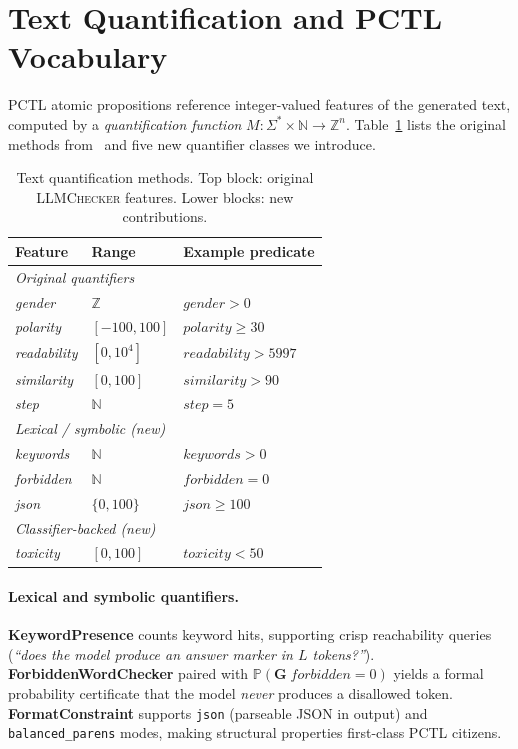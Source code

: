 \documentclass{article}
\newcommand{\Prob}{\mathbb{P}}
\newcommand{\Nat}{\mathbb{N}}
\begin{document}
\section{Text Quantification and PCTL Vocabulary}
\label{sec:quant}

PCTL atomic propositions reference integer-valued features of the generated
text, computed by a \emph{quantification function} $M: \Sigma^* \times \Nat \to
\mathbb{Z}^n$.
Table~\ref{tab:quant} lists the original methods from~\citet{gross2025llmchecker}
and five new quantifier classes we introduce.

\begin{table}[tb]
\centering
\small
\caption{Text quantification methods. Top block: original \textsc{LLMChecker}
features. Lower blocks: new contributions.}
\label{tab:quant}
\begin{tabular}{llp{2.5cm}}
\toprule
Feature & Range & Example predicate \\
\midrule
\multicolumn{3}{l}{\textit{Original quantifiers}} \\
\textit{gender} & $\mathbb{Z}$ & $\textit{gender} > 0$ \\
\textit{polarity} & $[-100, 100]$ & $\textit{polarity} \ge 30$ \\
\textit{readability} & $[0, 10^4]$ & $\textit{readability} > 5997$ \\
\textit{similarity} & $[0, 100]$ & $\textit{similarity} > 90$ \\
\textit{step} & $\Nat$ & $\textit{step} = 5$ \\
\midrule
\multicolumn{3}{l}{\textit{Lexical / symbolic (new)}} \\
\textit{keywords} & $\Nat$ & $\textit{keywords} > 0$ \\
\textit{forbidden} & $\Nat$ & $\textit{forbidden} = 0$ \\
\textit{json} & $\{0, 100\}$ & $\textit{json} \ge 100$ \\
\midrule
\multicolumn{3}{l}{\textit{Classifier-backed (new)}} \\
\textit{toxicity} & $[0, 100]$ & $\textit{toxicity} < 50$ \\
\bottomrule
\end{tabular}
\end{table}

\paragraph{Lexical and symbolic quantifiers.}
\textbf{KeywordPresence} counts keyword hits, supporting crisp reachability
queries (\emph{``does the model produce an answer marker in $L$ tokens?''}).
\textbf{ForbiddenWordChecker} paired with $\Prob(\mathbf{G}\;\textit{forbidden}{=}0)$
yields a formal probability certificate that the model \emph{never} produces a
disallowed token.
\textbf{FormatConstraint} supports \texttt{json} (parseable JSON in output) and
\texttt{balanced\_parens} modes, making structural properties first-class PCTL
citizens.
\end{document}
